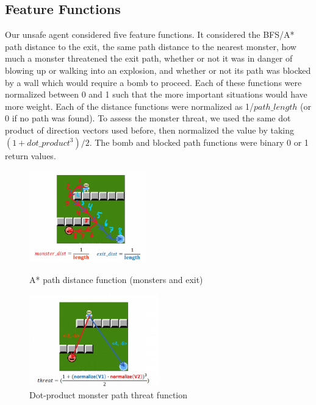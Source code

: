 \documentclass{article}
\begin{document}
\subsection*{Feature Functions}
Our unsafe agent considered five feature functions. It considered the BFS/A* path distance to the exit, the same path distance to the nearest monster, how much a monster threatened the exit path, whether or not it was in danger of blowing up or walking into an explosion, and whether or not its path was blocked by a wall which would require a bomb to proceed.
Each of these functions were normalized between 0 and 1 such that the more important situations would have more weight. Each of the distance functions were normalized as 1/$path\_length$ (or 0 if no path was found). To assess the monster threat, we used the same dot product of direction vectors used before, then normalized the value by taking $(1 + dot\_product^{3})/2$. The bomb and blocked path functions were binary 0 or 1 return values.


\begin{figure}[!htb]
   \begin{minipage}{0.48\textwidth}
     \centering
     \includegraphics[height=4cm]{Writeup/dist_fn.jpg}
     \caption*{A* path distance function (monsters and exit)}
   \end{minipage}\hfill
   \begin{minipage}{0.48\textwidth}
     \centering
     \includegraphics[height=4cm]{Writeup/threat_vec_fn.jpg}
     \caption*{Dot-product monster path threat function}
   \end{minipage}
\end{figure}
\end{document}

